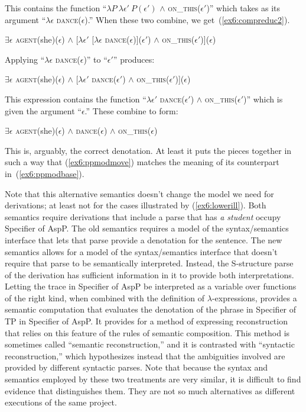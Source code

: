 This contains the function ``$\lambda P\ \lambda \epsilon'\ P(\epsilon')$ $\wedge$ \textsc{on\_this}($\epsilon'$)'' which takes as its argument ``$\lambda \epsilon$ \textsc{dance}($\epsilon$).'' When these two combine, we get~(\ref{ex6:compreduc2}).
\begin{exe}
\raggedright
	\ex \label{ex6:compreduc2}
	$\exists \epsilon$ \textsc{agent}(she)($\epsilon$) $\wedge$ {[}$\lambda \epsilon'$ {[}$\lambda \epsilon$ \textsc{dance}($\epsilon$){]}($\epsilon'$) $\wedge$ \textsc{on\_this}($\epsilon'$){]}($\epsilon$)
\end{exe}
Applying ``$\lambda \epsilon$ \textsc{dance}($\epsilon$)'' to ``$\epsilon'$'' produces:
\begin{exe}
\raggedright
	\ex \label{ex6:compreduc3}
	$\exists \epsilon$ \textsc{agent}(she)($\epsilon$) $\wedge$ {[}$\lambda \epsilon'$ \textsc{dance}($\epsilon'$) $\wedge$ \textsc{on\_this}($\epsilon'$){]}($\epsilon$)
\end{exe}
This expression contains the function ``$\lambda \epsilon'$ \textsc{dance}($\epsilon'$) $\wedge$ \textsc{on\_this}($\epsilon'$)'' which is given the argument ``$\epsilon$.'' These combine to form:
\begin{exe}
\raggedright
	\ex \label{ex6:compreduc4}
	$\exists \epsilon$ \textsc{agent}(she)($\epsilon$) $\wedge$ \textsc{dance}($\epsilon$) $\wedge$ \textsc{on\_this}($\epsilon$)
\end{exe}
This is, arguably, the correct denotation. At least it puts the pieces together in such a way that (\ref{ex6:ppmodmove}) matches the meaning of its counterpart in~(\ref{ex6:ppmodbase}).

Note that this alternative semantics doesn't change the model we need for derivations; at least not for the cases illustrated by (\ref{ex6:lowerill}). Both semantics require derivations that include a parse that has \emph{a student} occupy Specifier of AspP. The old semantics requires a model of the syntax/semantics interface that lets that parse provide a denotation for the sentence. The new semantics allows for a model of the syntax/semantics interface that doesn't require that parse to be semantically interpreted. Instead, the S-structure parse of the derivation has sufficient information in it to provide both interpretations. Letting the trace in Specifier of AspP be interpreted as a variable over functions of the right kind, when combined with the definition of $\lambda$-expressions, provides a semantic computation that evaluates the denotation of the phrase in Specifier of TP in Specifier of AspP. It provides for a method of expressing reconstruction that relies on this feature of the rules of semantic composition. This method is sometimes called ``semantic reconstruction,'' and it is contrasted with ``syntactic reconstruction,'' which hypothesizes instead that the ambiguities involved are provided by different syntactic parses. Note that because the syntax and semantics employed by these two treatments are very similar, it is difficult to find evidence that distinguishes them. They are not so much alternatives as different executions of the same project. 


